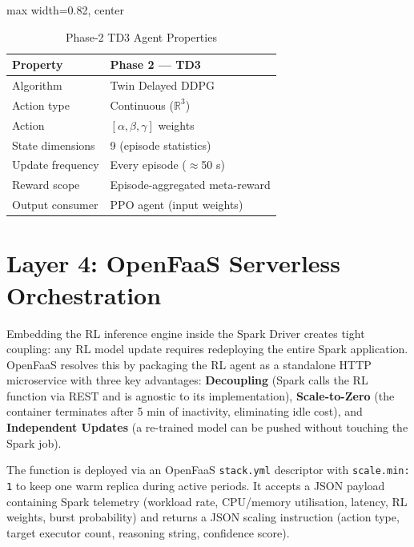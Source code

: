 \begin{table}[H]
\centering
\caption{Phase-2 TD3 Agent Properties}
\label{tab:td3_properties}
\begin{adjustbox}{max width=0.82\textwidth, center}
\begin{tabular}{p{3.8cm}p{7.2cm}}
\toprule
\textbf{Property} & \textbf{Phase 2 — TD3} \\
\midrule
Algorithm        & Twin Delayed DDPG \\
Action type      & Continuous ($\mathbb{R}^3$) \\
Action           & $[\alpha, \beta, \gamma]$ weights \\
State dimensions & 9 (episode statistics) \\
Update frequency & Every episode ($\approx$50 s) \\
Reward scope     & Episode-aggregated meta-reward \\
Output consumer  & PPO agent (input weights) \\
\bottomrule
\end{tabular}
\end{adjustbox}
\end{table}

\section{Layer 4: OpenFaaS Serverless Orchestration}
\label{sec:layer4}
Embedding the RL inference engine inside the Spark Driver creates tight coupling: any RL
model update requires redeploying the entire Spark application. OpenFaaS resolves this
by packaging the RL agent as a standalone HTTP microservice with three key advantages:
\textbf{Decoupling} (Spark calls the RL function via REST and is agnostic to its
implementation), \textbf{Scale-to-Zero} (the container terminates after 5 min of
inactivity, eliminating idle cost), and \textbf{Independent Updates} (a re-trained model
can be pushed without touching the Spark job).

The function is deployed via an OpenFaaS \texttt{stack.yml} descriptor with
\texttt{scale.min: 1} to keep one warm replica during active periods. It accepts a JSON
payload containing Spark telemetry (workload rate, CPU/memory utilisation, latency,
RL weights, burst probability) and returns a JSON scaling instruction (action type,
target executor count, reasoning string, confidence score).

